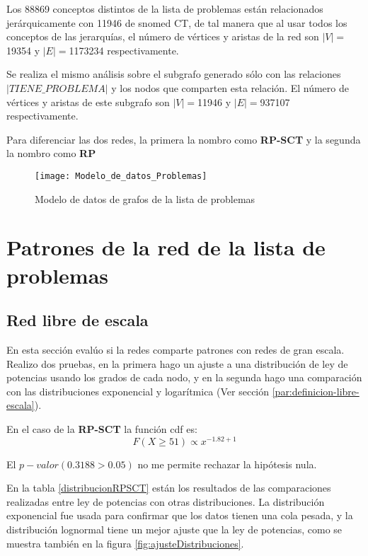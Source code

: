 Los \num{88869} conceptos distintos de la lista de problemas están relacionados jerárquicamente con \num{11946} de snomed CT, de tal manera que al usar todos los conceptos de las jerarquías, el número de vértices y aristas de la red son $|V|=$\num{19354} y $|E|=$\num{1173234} respectivamente. 

Se realiza el mismo análisis sobre el subgrafo generado sólo con las relaciones $|\textit{TIENE\_PROBLEMA}|$ y los nodos que comparten esta relación. El número de vértices y aristas de este subgrafo son $|V|=$\num{11946} y $|E|=$\num{937107} respectivamente.

Para diferenciar las dos redes, la primera la nombro como \textbf{\acrfull{RP-SCT}} y la segunda la nombro como \textbf{{\acrfull{RP}}}

\begin{figure}[ht]
\caption{Modelo de datos de grafos de la lista de problemas}
\label{fig:ModeloGrafo}
\centering
\texttt{[image: Modelo\_de\_datos\_Problemas]}
\end{figure}

\section{Patrones de la red de la lista de problemas}
\subsection{Red libre de escala}
En esta sección evalúo si la redes comparte patrones con redes de gran escala. Realizo dos pruebas, en la primera hago un ajuste a una distribución de ley de potencias usando los grados de cada nodo, y en la segunda hago una comparación con las distribuciones exponencial y logarítmica (Ver sección \ref{par:definicion-libre-escala}).

En el caso de la \textbf{\acrshort{RP-SCT}} la función \acrshort{cdf} es:
\begin{equation}
F(X\geq 51) \propto x^{-1.82 +1}
\end{equation}

El $p-valor(0.3188>0.05)$ no me permite rechazar la hipótesis nula.

En la tabla \ref{distribucionRPSCT} están los resultados de las comparaciones realizadas entre ley de potencias con otras distribuciones. La distribución exponencial fue usada para confirmar que los datos tienen una cola pesada, y la distribución lognormal tiene un mejor ajuste que la ley de potencias, como se muestra también en la figura \ref{fig:ajusteDistribuciones}.


